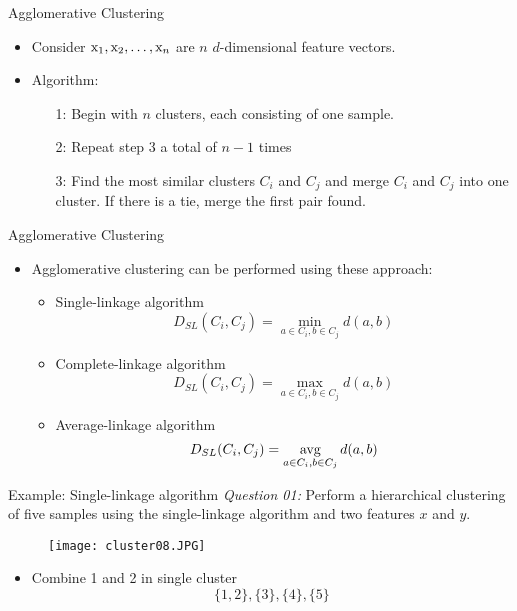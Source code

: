 \begin{frame}{Agglomerative Clustering}
\begin{itemize}
\setlength{\itemsep}{12pt}
\item Consider ${\rm x}_1,{\rm x}_2,\ldots,{\rm x}_n$ are $n$ $d$-dimensional feature vectors.
\item Algorithm:
\begin{itemize}
\item[1:] Begin with $n$ clusters, each consisting of one sample.
\item[2:] Repeat step 3 a total of $n-1$ times
\item[3:] Find the most similar clusters $C_i$ and $C_j$ and merge $C_i$ and $C_j$ into one cluster. If there is a tie, merge the first pair found.
\end{itemize}
\end{itemize}
\end{frame}

\begin{frame}{Agglomerative Clustering}
\begin{itemize}
\item Agglomerative clustering can be performed using these approach:
\begin{itemize}
\item Single-linkage algorithm
\begin{equation}
D_{SL}(C_i,C_j)=\min_{a\in C_i,b\in C_j}{d(a,b)} \nonumber
\end{equation}
\item Complete-linkage algorithm
\begin{equation}
D_{SL}(C_i,C_j)=\max_{a\in C_i,b\in C_j}{d(a,b)} \nonumber
\end{equation}
\item Average-linkage algorithm
\begin{equation}
D_{SL}(C_i,C_j)=\mathop {\rm avg}\limits_{a\in C_i,b\in C_j}{d(a,b)} \nonumber
\end{equation}
\end{itemize}
\end{itemize}
\end{frame}



\begin{frame}{Example: Single-linkage algorithm}
\textit{\color{slidecolor}Question 01:} Perform a hierarchical clustering of five samples using the single-linkage algorithm and two features $x$ and $y$.
\begin{figure}
\texttt{[image: cluster08.JPG]}
\end{figure}
\begin{itemize}
\item Combine 1 and 2 in single cluster
\begin{equation}
\{1,2\},\{3\},\{4\},\{5\}\nonumber
\end{equation}
\end{itemize}
\end{frame}

